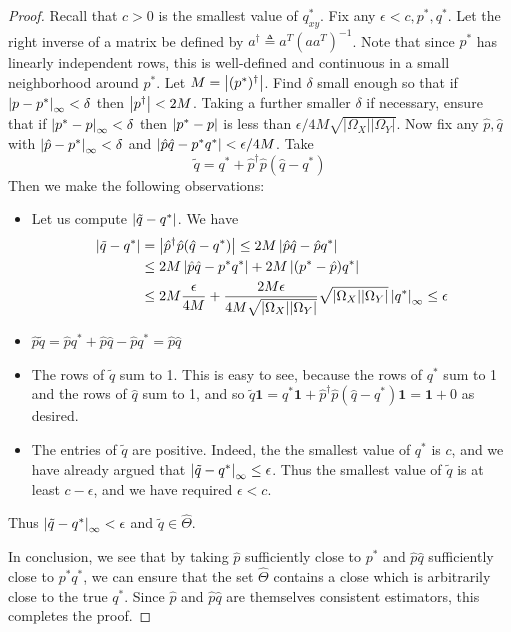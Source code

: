 \begin{proof}
Recall that $c>0$ is the smallest value of $q^*_{xy}$.  Fix any $\epsilon<c, p^*,q^*$.  Let the right inverse of a matrix be defined by $a^\dagger \triangleq a^T (aa^T)^{-1}$.  Note that since $p^*$ has linearly independent rows, this is well-defined and continuous in a small neighborhood around $p^*$.  Let $M=\left|(p^*)^\dagger\right|$.  Find $\delta$ small enough so that if $\left|p-p^*\right|_\infty<\delta$ then $\left|p^\dagger\right|<2M$.  Taking a further smaller $\delta$ if necessary, ensure that if $\left|p^*-p\right|_\infty<\delta$ then $\left|p^*-p\right|$ is less than $\epsilon / 4M\sqrt{|\Omega_X||\Omega_Y|}$.  
Now fix any $\hat p,\hat q$ with $\left|\hat p-p^*\right|_\infty<\delta$ and $\left|\hat p \hat q - p^*q^*\right|<\epsilon/4M$.  Take
\[
\tilde q = q^* + \hat p^\dagger \hat p (\hat q - q^*)
\] 
Then we make the following observations:
\begin{itemize}
  \item Let us compute $\left|\tilde q -q^*\right|$. We have
   \begin{align*}
   \left|\tilde q -q^*\right| &= \left|\hat p^\dagger \hat p (\hat q - q^*)\right| \leq 2M \left|\hat p \hat q - \hat p q^*\right| \\
        &\leq 2M \left|\hat p \hat q - p^* q^*\right| + 2M\left|(p^* - \hat p)q^*\right|\\
        &\leq 2M \frac{\epsilon}{4M} + \frac{2M\epsilon}{4M\sqrt{|\Omega_X||\Omega_Y|}}\sqrt{|\Omega_X||\Omega_Y|}\left|q^*\right|_\infty \leq \epsilon 
   \end{align*}
  \item $\hat p \tilde q = \hat p q^* + \hat p \hat q - \hat p q^* = \hat p \hat q$
  \item The rows of $\tilde q$ sum to 1.  This is easy to see, because the rows of $q^*$ sum to 1 and the rows of $\hat q$ sum to 1, and so $\tilde q \mathbf{1} = q^* \mathbf{1} + \hat p^\dagger \hat p (\hat q - q^*) \mathbf{1} = \mathbf{1} + 0$ as desired.
  \item The entries of $\tilde q$ are positive.   Indeed, the the smallest value of $q^*$ is $c$, and we have already argued that $\left|\tilde q - q^*\right|_\infty\leq \epsilon$.  Thus the smallest value of $\tilde q$ is at least $c-\epsilon$, and we have required $\epsilon<c$.  
\end{itemize}
Thus $\left|\tilde q - q^*\right|_\infty<\epsilon$ and $\tilde q \in \hat \Theta$.  

In conclusion, we see that by taking $\hat p$ sufficiently close to $p^*$ and $\hat p \hat q$ sufficiently close to $p^*q^*$, we can ensure that the set $\hat \Theta$ contains a close which is arbitrarily close to the true $q^*$.  Since $\hat p$ and $\hat p \hat q$ are themselves consistent estimators, this completes the proof.
\end{proof}

